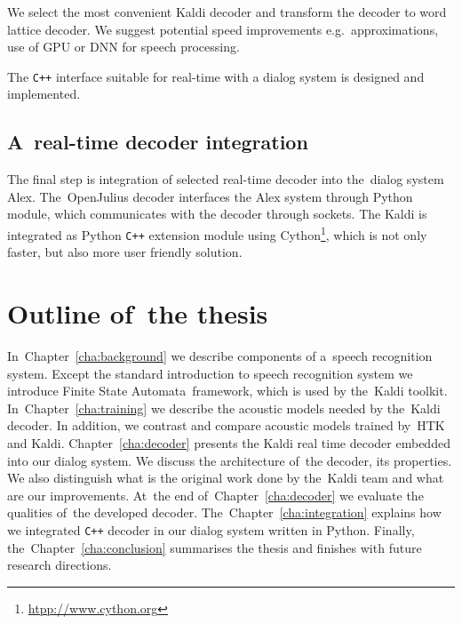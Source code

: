 We select the most convenient Kaldi decoder and 
transform the decoder to word lattice decoder. 
We suggest potential speed improvements e.g.\ approximations, use of \ac{GPU} 
or \ac{DNN} for speech processing\cite{TODO_KALDI_DNN}.

The \verb!C++! interface suitable for real-time with a dialog system is designed and implemented.

\subsection{A~real-time decoder integration} 
\label{sub:integration}
The final step is integration of selected real-time decoder into the~dialog system Alex.
The~OpenJulius decoder interfaces the Alex system through Python module, 
which communicates with the decoder through sockets.
The Kaldi is integrated as Python \verb!C++! extension module 
using Cython\footnote{\url{htpp://www.cython.org}}, 
which is not only faster, but also more user friendly solution.


\section{Outline of~the thesis} 
\label{sec:outline_of_the_thesis}
In~Chapter~\ref{cha:background} we describe components of a~speech recognition system.  
Except the standard introduction to speech recognition system we introduce Finite State Automata~framework,
which is used by the~Kaldi toolkit. In~Chapter~\ref{cha:training} we describe the acoustic 
models needed by the~Kaldi decoder. 
In addition, we contrast and compare acoustic models trained by~\ac{HTK} and Kaldi. 
Chapter~\ref{cha:decoder} presents the Kaldi real time decoder embedded into our dialog system.
We discuss the architecture of~the decoder, its properties. We also distinguish what is the original work done by 
the~Kaldi team and what are our improvements. At~the end of~Chapter~\ref{cha:decoder} 
we evaluate the qualities of~the developed decoder.
The~Chapter~\ref{cha:integration} explains how we integrated \verb!C++! decoder in our dialog system written in Python.
Finally, the~Chapter~\ref{cha:conclusion} summarises the thesis and finishes with future research directions.

